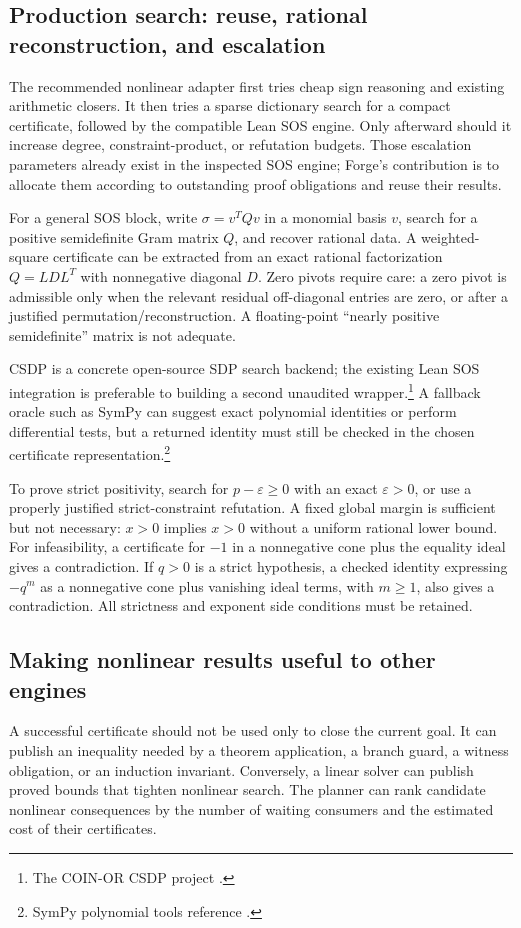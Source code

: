 \documentclass[11pt,a4paper]{article}
\begin{document}
\subsection{Production search: reuse, rational reconstruction, and escalation}
The recommended nonlinear adapter first tries cheap sign reasoning and existing
arithmetic closers. It then tries a sparse dictionary search for a compact
certificate, followed by the compatible Lean SOS engine. Only afterward should
it increase degree, constraint-product, or refutation budgets. Those escalation
parameters already exist in the inspected SOS engine; Forge's contribution is
to allocate them according to outstanding proof obligations and reuse their
results.

For a general SOS block, write $\sigma=v^TQv$ in a monomial basis $v$, search
for a positive semidefinite Gram matrix $Q$, and recover rational data. A
weighted-square certificate can be extracted from an exact rational
factorization $Q=LDL^T$ with nonnegative diagonal $D$. Zero pivots require care:
a zero pivot is admissible only when the relevant residual off-diagonal entries
are zero, or after a justified permutation/reconstruction. A floating-point
``nearly positive semidefinite'' matrix is not adequate.

CSDP is a concrete open-source SDP search backend; the existing Lean SOS
integration is preferable to building a second unaudited wrapper.\footnote{The
COIN-OR CSDP project \cite{csdp}.}
A fallback oracle such as SymPy can suggest exact polynomial identities or
perform differential tests, but a returned identity must still be checked in
the chosen certificate representation.\footnote{SymPy polynomial tools
reference \cite{sympy}.}

To prove strict positivity, search for $p-\varepsilon\ge0$ with an exact
$\varepsilon>0$, or use a properly justified strict-constraint refutation.
A fixed global margin is sufficient but not necessary: $x>0$ implies $x>0$
without a uniform rational lower bound. For infeasibility, a certificate for
$-1$ in a nonnegative cone plus the equality ideal gives a contradiction.
If $q>0$ is a strict hypothesis, a checked identity expressing $-q^m$ as a
nonnegative cone plus vanishing ideal terms, with $m\ge1$, also gives a
contradiction. All strictness and exponent side conditions must be retained.

\subsection{Making nonlinear results useful to other engines}
A successful certificate should not be used only to close the current goal.
It can publish an inequality needed by a theorem application, a branch guard,
a witness obligation, or an induction invariant. Conversely, a linear solver
can publish proved bounds that tighten nonlinear search. The planner can rank
candidate nonlinear consequences by the number of waiting consumers and the
estimated cost of their certificates.
\end{document}
